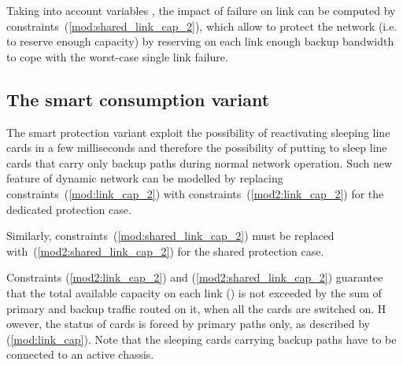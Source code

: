 \documentclass[final,5p,times,twocolumn]{elsarticle}
\begin{document}
Taking into account variables , the impact of failure   on link  can be computed by constraints~(\ref{mod:shared_link_cap_2}), which allow to protect the network (i.e. to reserve enough capacity) by reserving on each link enough backup bandwidth to cope with the worst-case single link failure.





\subsection{The smart consumption variant}\label{sec:smart}
The smart protection variant exploit the possibility of reactivating sleeping line cards in a few milliseconds and therefore the possibility of putting to sleep line cards that carry only backup paths during normal network operation. Such new feature of  dynamic network can be modelled by replacing constraints~(\ref{mod:link_cap_2}) with constraints~(\ref{mod2:link_cap_2}) for the dedicated protection case.

 
Similarly, constraints~(\ref{mod:shared_link_cap_2}) must be replaced with~(\ref{mod2:shared_link_cap_2}) for the shared protection case.



Constraints (\ref{mod2:link_cap_2}) and (\ref{mod2:shared_link_cap_2}) guarantee that the total available capacity on each link () is not exceeded by the sum of primary and backup traffic routed on it, when all the cards are switched on. H
owever, the status of cards is forced by primary paths only, as described by (\ref{mod:link_cap}). Note that the sleeping cards carrying backup paths have to be connected to an active chassis.
\end{document}
